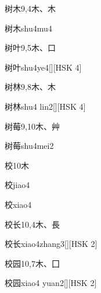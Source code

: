 \begin{entry}{树木}{9,4}{⽊、⽊}
  \begin{phonetics}{树木}{shu4mu4}
  \end{phonetics}
\end{entry}

\begin{entry}{树叶}{9,5}{⽊、⼝}
  \begin{phonetics}{树叶}{shu4ye4}[][HSK 4]
  \end{phonetics}
\end{entry}

\begin{entry}{树林}{9,8}{⽊、⽊}
  \begin{phonetics}{树林}{shu4 lin2}[][HSK 4]
  \end{phonetics}
\end{entry}

\begin{entry}{树莓}{9,10}{⽊、⾋}
  \begin{phonetics}{树莓}{shu4mei2}
  \end{phonetics}
\end{entry}

\begin{entry}{校}{10}{⽊}
  \begin{phonetics}{校}{jiao4}
  \end{phonetics}
  \begin{phonetics}{校}{xiao4}
  \end{phonetics}
\end{entry}

\begin{entry}{校长}{10,4}{⽊、⾧}
  \begin{phonetics}{校长}{xiao4zhang3}[][HSK 2]
  \end{phonetics}
\end{entry}

\begin{entry}{校园}{10,7}{⽊、⼞}
  \begin{phonetics}{校园}{xiao4 yuan2}[][HSK 2]
  \end{phonetics}
\end{entry}

